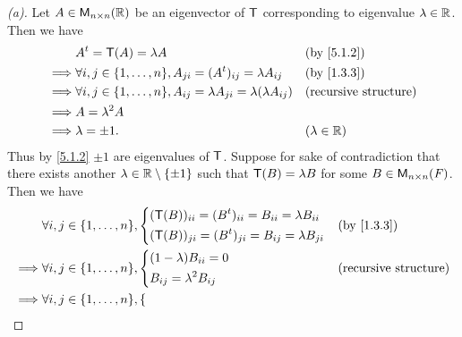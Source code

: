\begin{proof}[(a)]
  Let \(A \in \mathsf{M}_{{n} \times n}({\mathbb{R}})\) be an eigenvector of \(\mathsf{T}\) corresponding to eigenvalue \(\lambda \in \mathbb{R}\).
  Then we have
  \begin{align*}
             & \tp{A} = \T(A) = \lambda A                                                                &  & \text{(by \cref{5.1.2})}     \\
    \implies & \forall i, j \in \set{1, \dots, n}, A_{j i} = (\tp{A})_{i j} = \lambda A_{i j}            &  & \text{(by \cref{1.3.3})}     \\
    \implies & \forall i, j \in \set{1, \dots, n}, A_{i j} = \lambda A_{j i} = \lambda (\lambda A_{i j}) &  & \text{(recursive structure)} \\
    \implies & A = \lambda^2 A                                                                                                             \\
    \implies & \lambda = \pm 1.                                                                          &  & (\lambda \in \R)
  \end{align*}
  Thus by \cref{5.1.2} \(\pm 1\) are eigenvalues of \(\mathsf{T}\).
  Suppose for sake of contradiction that there exists another \(\lambda \in \mathbb{R} \setminus \left\lbrace\pm 1\right\rbrace\) such that \(\mathsf{T}(B) = \lambda B\) for some \(B \in \mathsf{M}_{{n} \times n}({\mathit{F}})\).
  Then we have
  \begin{align*}
             & \forall i, j \in \set{1, \dots, n}, \begin{dcases}
                                                     (\T(B))_{i i} = (\tp{B})_{i i} = B_{i i} = \lambda B_{i i} \\
                                                     (\T(B))_{j i} = (\tp{B})_{j i} = B_{i j} = \lambda B_{j i}
                                                   \end{dcases} &  & \text{(by \cref{1.3.3})} \\
    \implies & \forall i, j \in \set{1, \dots, n}, \begin{dcases}
                                                     (1 - \lambda) B_{i i} = 0 \\
                                                     B_{i j} = \lambda^2 B_{i j}
                                                   \end{dcases}            &  & \text{(recursive structure)}  \\
    \implies & \forall i, j \in \set{1, \dots, n}, \begin{dcases}

\end{dcases}
\end{align*}
\end{proof}
